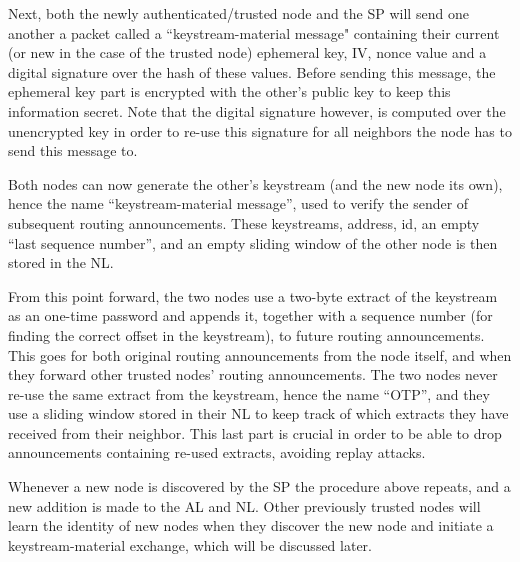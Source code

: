 Next, both the newly authenticated/trusted node and the \ac{SP} will send one
another a packet called a ``keystream-material message" containing their
current (or new in the case of the trusted node) ephemeral key, \ac{IV}, nonce
value and a digital signature over the hash of these values. Before sending
this message, the ephemeral key part is encrypted with the other's public key
to keep this information secret. Note that the digital signature however, is
computed over the unencrypted key in order to re-use this signature for all
neighbors the node has to send this message to.

Both nodes can now generate the other's keystream (and the new node its own),
hence the name ``keystream-material message'', used to verify the sender of
subsequent routing announcements. These keystreams, address, id, an empty ``last
sequence number'', and an empty sliding window of the other node is then stored
in the \ac{NL}.


From this point forward, the two nodes use a two-byte extract of the keystream
as an one-time password and appends it, together with a sequence number (for
finding the correct offset in the keystream), to future routing announcements.
This goes for both original routing announcements from the node itself, and when
they forward other trusted nodes' routing announcements. The two nodes never
re-use the same extract from the keystream, hence the name ``\acf{OTP}'', and
they use a sliding window stored in their \ac{NL} to keep track of which
extracts they have received from their neighbor. This last part is crucial in
order to be able to drop announcements containing re-used extracts, avoiding
replay attacks. 

Whenever a new node is discovered by the \ac{SP} the procedure above repeats,
and a new addition is made to the \ac{AL} and \ac{NL}. Other previously
trusted nodes will learn the identity of new nodes when they discover the new
node and initiate a keystream-material exchange, which will be discussed
later.

